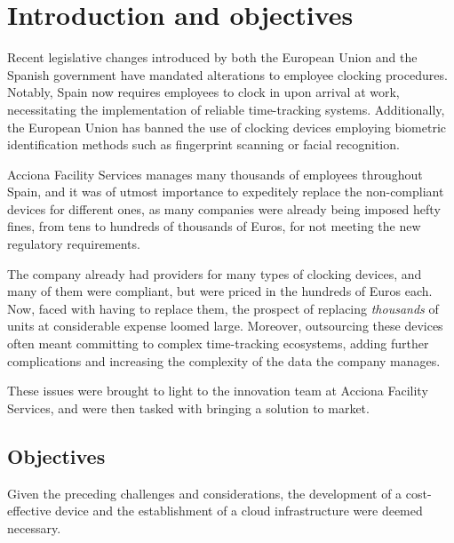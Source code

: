 \chapter{Introduction and objectives}
\label{cap:introduction}


Recent legislative changes introduced by both the European Union and the Spanish government have mandated 
alterations to employee clocking procedures. Notably, Spain now requires employees to clock in upon arrival 
at work, necessitating the implementation of reliable time-tracking systems. Additionally, the European Union 
has banned the use of clocking devices employing biometric identification methods such as fingerprint 
scanning or facial recognition.

Acciona Facility Services manages many thousands of employees throughout Spain, and it was of utmost importance
to expeditely replace the non-compliant devices for different ones, as many companies were already being
imposed hefty fines, from tens to hundreds of thousands of Euros, for not meeting the new regulatory 
requirements.

The company already had providers for many types of clocking devices, and many of them were compliant, but 
were priced in the hundreds of Euros each. Now, faced with having to replace them, the prospect of replacing 
\textit{thousands} of units at considerable expense loomed large.  Moreover, outsourcing these devices often 
meant committing to complex time-tracking ecosystems, adding further complications and increasing the
complexity of the data the company manages.

These issues were brought to light to the innovation team at Acciona Facility Services, and were then tasked
with bringing a solution to market.

\section{Objectives}

Given the preceding challenges and considerations, the development of a cost-effective device and the establishment 
of a cloud infrastructure were deemed necessary.

